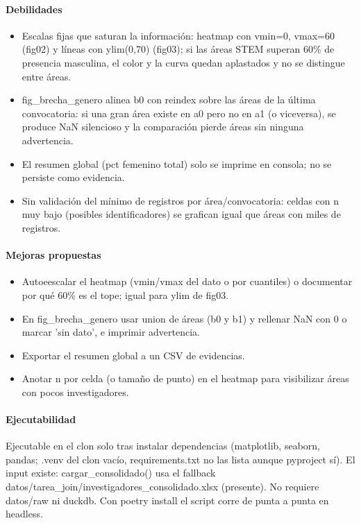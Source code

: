 \paragraph{Debilidades}
\begin{itemize}
  \item Escalas fijas que saturan la información: heatmap con vmin=0, vmax=60 (fig02) y líneas con ylim(0,70) (fig03); si las áreas STEM superan 60\% de presencia masculina, el color y la curva quedan aplastados y no se distingue entre áreas.
  \item fig\_brecha\_genero alinea b0 con reindex sobre las áreas de la última convocatoria: si una gran área existe en a0 pero no en a1 (o viceversa), se produce NaN silencioso y la comparación pierde áreas sin ninguna advertencia.
  \item El resumen global (pct femenino total) solo se imprime en consola; no se persiste como evidencia.
  \item Sin validación del mínimo de registros por área/convocatoria: celdas con n muy bajo (posibles identificadores) se grafican igual que áreas con miles de registros.
\end{itemize}

\paragraph{Mejoras propuestas}
\begin{itemize}
  \item Autoeescalar el heatmap (vmin/vmax del dato o por cuantiles) o documentar por qué 60\% es el tope; igual para ylim de fig03.
  \item En fig\_brecha\_genero usar union de áreas (b0 y b1) y rellenar NaN con 0 o marcar 'sin dato', e imprimir advertencia.
  \item Exportar el resumen global a un CSV de evidencias.
  \item Anotar n por celda (o tamaño de punto) en el heatmap para visibilizar áreas con pocos investigadores.
\end{itemize}

\paragraph{Ejecutabilidad}
Ejecutable en el clon solo tras instalar dependencias (matplotlib, seaborn, pandas; .venv del clon vacío, requirements.txt no las lista aunque pyproject sí). El input existe: cargar\_consolidado() usa el fallback datos/tarea\_join/investigadores\_consolidado.xlsx (presente). No requiere datos/raw ni duckdb. Con poetry install el script corre de punta a punta en headless.

